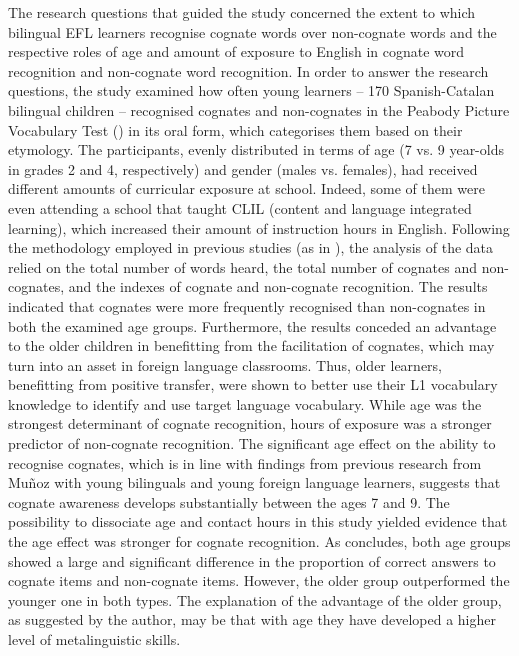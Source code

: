 \documentclass[output=paper,colorlinks,citecolor=brown,nonflat]{langsci/langscibook}
\begin{document}
The research questions that guided the study concerned the extent to which bilingual EFL learners recognise cognate words over non-cognate words and the respective roles of age and amount of exposure to English in cognate word recognition and non-cognate word recognition. In order to answer the research questions, the study examined how often young learners – 170 Spanish-Catalan bilingual children – recognised cognates and non-cognates in the Peabody Picture Vocabulary Test (\citealt{DunnDunn2007}) in its oral form, which categorises them based on their etymology. The participants, evenly distributed in terms of age (7 vs. 9 year-olds in grades 2 and 4, respectively) and gender (males vs. females), had received different amounts of curricular exposure at school. Indeed, some of them were even attending a school that taught CLIL (content and language integrated learning), which increased their amount of instruction hours in English. Following the methodology employed in previous studies (as in \citealt{MuñozCadiernoCasas2018}), the analysis of the data relied on the total number of words heard, the total number of cognates and non-cognates, and the indexes of cognate and non-cognate recognition. The results indicated that cognates were more frequently recognised than non-cognates in both the examined age groups. Furthermore, the results conceded an advantage to the older children in benefitting from the facilitation of cognates, which may turn into an asset in foreign language classrooms. Thus, older learners, benefitting from positive transfer, were shown to better use their L1 vocabulary knowledge to identify and use target language vocabulary. While age was the strongest determinant of cognate recognition, hours of exposure was a stronger predictor of non-cognate recognition. The significant age effect on the ability to recognise cognates, which is in line with findings from previous research from Muñoz with young bilinguals and young foreign language learners, suggests that cognate awareness develops substantially between the ages 7 and 9. The possibility to dissociate age and contact hours in this study yielded evidence that the age effect was stronger for cognate recognition. As \citeauthor{chapters/munoz} concludes, both age groups showed a large and significant difference in the proportion of correct answers to cognate items and non-cognate items. However, the older group outperformed the younger one in both types. The explanation of the advantage of the older group, as suggested by the author, may be that with age they have developed a higher level of metalinguistic skills.
\end{document}
